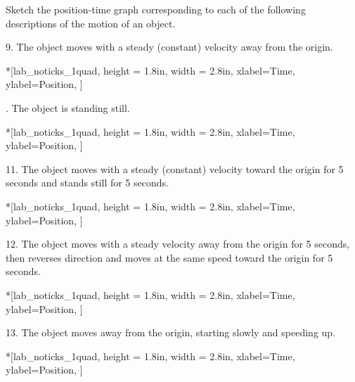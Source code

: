 Sketch the position-time graph corresponding to each of the following descriptions
of the motion of an object.

9. The object moves with a steady (constant) velocity away from the origin.

\begin{lab_axis}*[lab_noticks_1quad,
	height = {1.8in}, width = {2.8in},
	xlabel={Time},
	ylabel={Position},
	]
\end{lab_axis}

. The object is standing still.

\begin{lab_axis}*[lab_noticks_1quad,
	height = {1.8in}, width = {2.8in},
	xlabel={Time},
	ylabel={Position},
	]
\end{lab_axis}

11. The object moves with a steady (constant) velocity toward the origin for
5 seconds and stands still for 5 seconds.

\begin{lab_axis}*[lab_noticks_1quad,
	height = {1.8in}, width = {2.8in},
	xlabel={Time},
	ylabel={Position},
	]
\end{lab_axis}

12. The object moves with a steady velocity away from the origin for 5 seconds,
then reverses direction and moves at the same speed toward the origin for 5
seconds.

\begin{lab_axis}*[lab_noticks_1quad,
	height = {1.8in}, width = {2.8in},
	xlabel={Time},
	ylabel={Position},
	]
\end{lab_axis}

13. The object moves away from the origin, starting slowly and speeding up.

\begin{lab_axis}*[lab_noticks_1quad,
	height = {1.8in}, width = {2.8in},
	xlabel={Time},
	ylabel={Position},
	]
\end{lab_axis}


